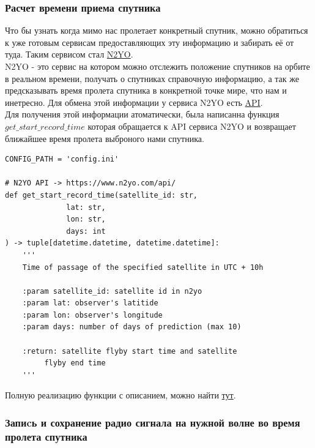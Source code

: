 \documentclass[a4paper, 14pt, titlepage, fleqn]{extarticle}
\begin{document}
	\subsubsection*{Расчет времени приема спутника}
	
	Что бы узнать когда мимо нас пролетает конкретный спутник, можно обратиться к уже готовым сервисам предоставляющих эту информацию и забирать её от туда. Таким сервисом стал \href{https://www.n2yo.com/?s=33591}{N2YO}. \\
	
	 N2YO - это сервис на котором можно отслежить положение спутников на орбите в реальном времени, получать о спутниках справочную информацию, а так же предсказывать время пролета спутника в конкретной точке мире, что нам и инетресно. Для обмена этой информации у сервиса N2YO есть \href{https://www.n2yo.com/api/}{API}. \\
	
	 Для получения этой информации атоматически, была написанна функция $get\_start\_record\_time$ которая обращается к API сервиса N2YO и возвращает ближайшее время пролета выброного нами спутника.
	
	\begin{verbatim}
CONFIG_PATH = 'config.ini'

# N2YO API -> https://www.n2yo.com/api/
def get_start_record_time(satellite_id: str, 
			  lat: str, 
			  lon: str, 
			  days: int
) -> tuple[datetime.datetime, datetime.datetime]:
    '''
    Time of passage of the specified satellite in UTC + 10h

    :param satellite_id: satellite id in n2yo
    :param lat: observer's latitide
    :param lon: observer's longitude
    :param days: number of days of prediction (max 10)
    
    :return: satellite flyby start time and satellite
    	 flyby end time
    '''
	\end{verbatim}
	
	\noindent Полную реализацию функции с описанием, можно найти \href{https://github.com/kitfloppa/sdr-sat-receiving/blob/main/script_noaa_data_receiver.py#L18}{тут}. \\
	
	\pagebreak
	\subsubsection*{Запиcь и сохранение радио сигнала на нужной волне во время пролета спутника}
	
\end{document}
